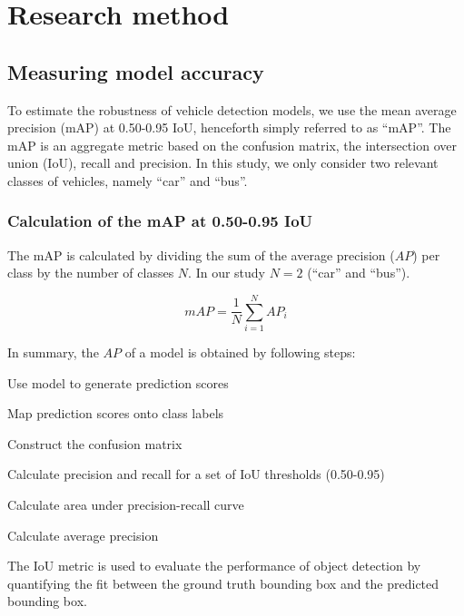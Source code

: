 \documentclass[]{article}
\begin{document}
\section{Research method}
\subsection{Measuring model accuracy}

	To estimate the robustness of vehicle detection models, we use the mean average precision (mAP) at 0.50-0.95 IoU, henceforth simply referred to as ``mAP''. The mAP is an aggregate metric based on the confusion matrix, the intersection over union (IoU), recall and precision. In this study, we only consider two relevant classes of vehicles, namely ``car'' and ``bus''.

\subsubsection{Calculation of the mAP at 0.50-0.95 IoU}

	The mAP is calculated by dividing the sum of the average precision ($AP$) per class by the number of classes $N$.  In our study $N = 2$ (``car'' and ``bus'').
	
	\[
	mAP = \frac{1}{N} \sum_{i=1}^{N} AP_i
	\]

	In summary, the $AP$ of a model is obtained by following steps:

	\begin{center}
		\begin{compactenum}
			\item Use model to generate prediction scores
			\item Map prediction scores onto class labels
			\item Construct the confusion matrix
			\item Calculate precision and recall for a set of IoU thresholds (0.50-0.95)
			\item Calculate area under precision-recall curve
			\item Calculate average precision
		\end{compactenum}
	\end{center}

	The IoU metric is used to evaluate the performance of object detection by quantifying the fit between the ground truth bounding box and the predicted bounding box.
	
\end{document}
